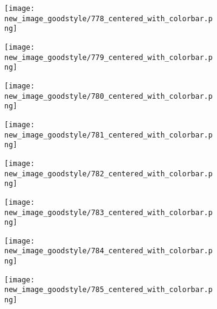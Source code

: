 \documentclass[a4paper,12pt]{article}
\begin{document}
\begin{figure}[H]
  \begin{subfigure}{0.11\textwidth}
    \texttt{[image: new\_image\_goodstyle/778\_centered\_with\_colorbar.png]}
  \end{subfigure}
  \hfill
  \begin{subfigure}{0.11\textwidth}
    \texttt{[image: new\_image\_goodstyle/779\_centered\_with\_colorbar.png]}
  \end{subfigure}
  \hfill
  \begin{subfigure}{0.11\textwidth}
    \texttt{[image: new\_image\_goodstyle/780\_centered\_with\_colorbar.png]}
  \end{subfigure}
  \hfill
  \begin{subfigure}{0.11\textwidth}
    \texttt{[image: new\_image\_goodstyle/781\_centered\_with\_colorbar.png]}
  \end{subfigure}
  \hfill
  \begin{subfigure}{0.11\textwidth}
    \texttt{[image: new\_image\_goodstyle/782\_centered\_with\_colorbar.png]}
  \end{subfigure}
  \hfill
  \begin{subfigure}{0.11\textwidth}
    \texttt{[image: new\_image\_goodstyle/783\_centered\_with\_colorbar.png]}
  \end{subfigure}
  \hfill
  \begin{subfigure}{0.11\textwidth}
    \texttt{[image: new\_image\_goodstyle/784\_centered\_with\_colorbar.png]}
  \end{subfigure}
  \hfill
  \begin{subfigure}{0.11\textwidth}
    \texttt{[image: new\_image\_goodstyle/785\_centered\_with\_colorbar.png]}
  \end{subfigure}
  \hfill
\end{figure}
\end{document}
